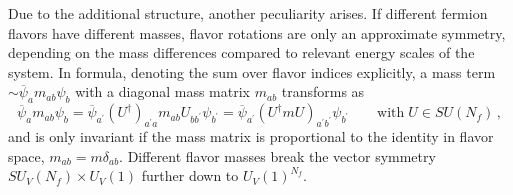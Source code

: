 Due to the additional structure, another peculiarity arises. If different fermion flavors have different masses, flavor rotations are only an approximate symmetry, depending on the mass differences compared to relevant energy scales of the system. In formula, denoting the sum over flavor indices explicitly, a mass term ${\sim\overline{\psi}_am_{ab}\psi_b}$ with a diagonal mass matrix $m_{ab}$ transforms as
\begin{equation}
    \overline{\psi}_am_{ab}\psi_b=\overline{\psi}_{a^\prime}(U^\dagger)_{a^\prime a}m_{ab}U_{bb^\prime}\psi_{b^\prime}=\overline{\psi}_{a^\prime}(U^\dagger mU)_{a^\prime b^\prime}\psi_{b^\prime}\qquad\text{with}\;U\in SU(N_f)\,,
\end{equation}
and is only invariant if the mass matrix is proportional to the identity in flavor space, ${m_{ab}=m\delta_{ab}}$. Different flavor masses break the vector symmetry ${SU_V(N_f)\times U_V(1)}$ further down to ${U_V(1)^{N_f}}$.

